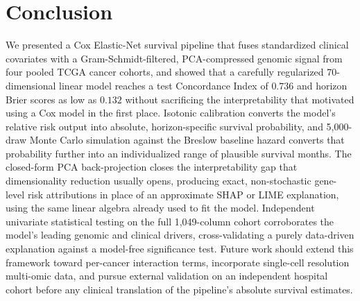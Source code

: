\documentclass[sigconf, review=true]{acmart}
\begin{document}
\section{Conclusion}
We presented a Cox Elastic-Net survival pipeline that fuses standardized clinical covariates with a Gram-Schmidt-filtered, PCA-compressed genomic signal from four pooled TCGA cancer cohorts, and showed that a carefully regularized 70-dimensional linear model reaches a test Concordance Index of $0.736$ and horizon Brier scores as low as $0.132$ without sacrificing the interpretability that motivated using a Cox model in the first place. Isotonic calibration converts the model's relative risk output into absolute, horizon-specific survival probability, and 5,000-draw Monte Carlo simulation against the Breslow baseline hazard converts that probability further into an individualized range of plausible survival months. The closed-form PCA back-projection closes the interpretability gap that dimensionality reduction usually opens, producing exact, non-stochastic gene-level risk attributions in place of an approximate SHAP or LIME explanation, using the same linear algebra already used to fit the model. Independent univariate statistical testing on the full 1,049-column cohort corroborates the model's leading genomic and clinical drivers, cross-validating a purely data-driven explanation against a model-free significance test. Future work should extend this framework toward per-cancer interaction terms, incorporate single-cell resolution multi-omic data, and pursue external validation on an independent hospital cohort before any clinical translation of the pipeline's absolute survival estimates.



\end{document}
